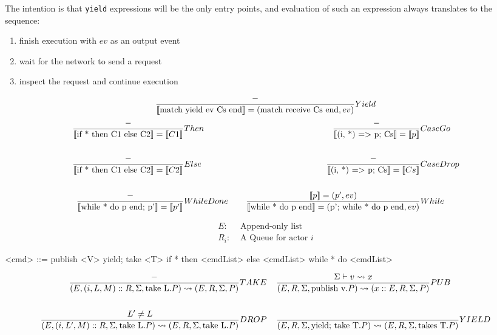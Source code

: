 \documentclass[acmsmall,review,anonymous]{acmart}\settopmatter{printfolios=true}
\begin{document}
The intention is that \texttt{yield} expressions will be the only entry points, and evaluation of such an expression always translates to the sequence:
\begin{enumerate}
\item finish execution with $ev$ as an output event
\item wait for the network to send a request 
\item inspect the request and continue execution
\end{enumerate}

\[
\judge{Yield}{
	-
}{
	\semfunc[\text{match yield ev Cs end}] = (\text{match receive Cs end}, ev)  %
}
\]
\begin{align*}
\judge{&Then}{
	-
}{
	\semfunc[\text{if * then C1 else C2}] = \semfunc[C1]
}& \;\;\;\;
\judge{&CaseGo}{
	- %
}{
	\semfunc[\text{(i, *) => p; Cs}] = \semfunc[p]
}\\
\\
\judge{&Else}{
	-
}{
	\semfunc[\text{if * then C1 else C2}] = \semfunc[C2]
}& \;\;\;\;
\judge{&CaseDrop}{
	-
}{
	\semfunc[\text{(i, *) => p; Cs}] = \semfunc[Cs]
}\\
\\
\judge{&WhileDone}{
	-
}{
	\semfunc[\text{while * do p end; p'}] = \semfunc[p']
}& \;\;\;\;
\judge{&While}{
	\semfunc[p] = (p', ev)
}{
	\semfunc[\text{while * do p end}] = (\text{p'; while * do p end}, ev)
}
\end{align*}

\vfill
\pagebreak




\begin{align*}
	E :& \text{ Append-only list} \\
    R_i :& \text{ A Queue for actor } i
\end{align*}

\begin{grammar}
	<cmd> ::= publish <V>
         \alt yield; take <T>
         \alt if * then <cmdList> else <cmdList>
         \alt while * do <cmdList>
\end{grammar}


\begin{align*}
\judge{TAKE}{
	-
}{
	(E, (i, L, M)::R, \Sigma, \text{take L}.P) \reduce (E, R, \Sigma, P)
}& \;\;\;\;
\judge{PUB}{
	\Sigma \vdash v \reduce x
}{
	(E, R, \Sigma, \text{publish v}.P)\reduce (x::E, R, \Sigma, P)
}\\
\\
\judge{DROP}{
	L' \neq L
}{
	(E, (i, L', M)::R, \Sigma, \text{take L}.P) \reduce (E, R, \Sigma, \text{take L}.P)
} & \;\;\;\;
\judge{YIELD}{
	 \;
}{
	(E, R, \Sigma, \text{yield; take T}.P) \reduce (E, R, \Sigma, \text{takes T}.P)
}
\end{align*}
\end{document}
